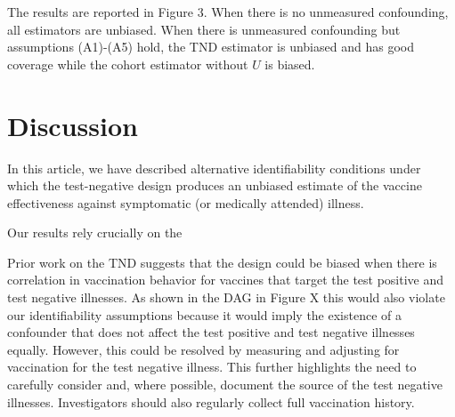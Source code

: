 \documentclass[11pt]{article}
\begin{document}
The results are reported in Figure 3. When there is no unmeasured confounding, all estimators are unbiased. When there is unmeasured confounding but assumptions (A1)-(A5) hold, the TND estimator is unbiased and has good coverage while the cohort estimator without $U$ is biased. %


\section{Discussion} \label{sec:discussion}

In this article, we have described alternative identifiability conditions under which the test-negative design produces an unbiased estimate of the vaccine effectiveness against symptomatic (or medically attended) illness. 

Our results rely crucially on the

Prior work on the TND suggests that the design could be biased when there is correlation in vaccination behavior for vaccines that target the test positive and test negative illnesses. As shown in the DAG in Figure X this would also violate our identifiability assumptions because it would imply the existence of a confounder that does not affect the test positive and test negative illnesses equally. However, this could be resolved by measuring and adjusting for vaccination for the test negative illness. This further highlights the need to carefully consider and, where possible, document the source of the test negative illnesses. Investigators should also regularly collect full vaccination history.
\end{document}
